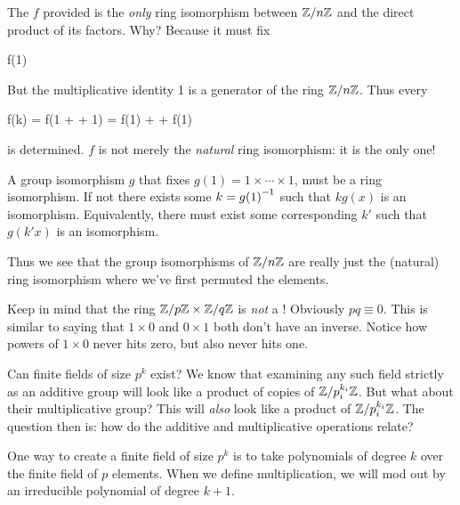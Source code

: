 \begin{remark}
  The $f$ provided is the \emph{only} ring isomorphism between $\mathbb{Z} / n\mathbb{Z}$
  and the direct product of its factors. Why? Because it must fix

  \begin{nedqn}
    f(1)
   \times \cdots {}
  \end{nedqn}

  \noindent
  But the multiplicative identity 1 is a generator of the ring $\mathbb{Z} / n\mathbb{Z}$.
  Thus every

  \begin{nedqn}
    f(k) = f(1 + \cdots + 1) = f(1) + \cdots + f(1)
  \end{nedqn}

  \noindent
  is determined. $f$ is not merely the \emph{natural} ring isomorphism:
  it is the only one!
\end{remark}

\begin{remark}
  A group isomorphism $g$ that fixes $g(1) = 1 \times\cdots\times 1$,
  must be a ring isomorphism. If not there exists some $k = {g(1)}^{-1}$
  such that $k g(x)$ is an isomorphism. Equivalently, there must exist
  some corresponding $k'$ such that $g(k'x)$ is an isomorphism.

  Thus we see that the group isomorphisms of $\mathbb{Z} / n\mathbb{Z}$ are really just
  the (natural) ring isomorphism where we've first permuted the
  elements.
\end{remark}

\begin{remark}
  Keep in mind that the ring $\mathbb{Z} / p\mathbb{Z} \times \mathbb{Z} / q\mathbb{Z}$ is \emph{not} a
  ! Obviously $pq \equiv 0$. This is similar to saying that
  $1 \times 0$ and $0 \times 1$ both don't have an inverse. Notice how
  powers of $1 \times 0$ never hits zero, but also never hits one.

  Can finite fields of size $p^k$ exist? We know that examining any such
  field strictly as an additive group will look like a product of copies
  of $\mathbb{Z} / p_i^{k_i}\mathbb{Z}$. But what about their multiplicative group? This
  will \emph{also} look like a product of $\mathbb{Z} / p_i^{k_i}\mathbb{Z}$. The
  question then is: how do the additive and multiplicative operations
  relate?

  One way to create a finite field of size $p^k$ is to take polynomials
  of degree $k$ over the finite field of $p$ elements. When we define
  multiplication, we will mod out by an irreducible polynomial of degree
  $k+1$.
\end{remark}

